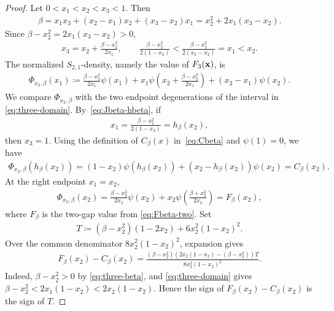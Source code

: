 \documentclass[10pt,a4paper]{article}
\begin{document}
\begin{proof}
Let $0<x_1<x_2<x_3<1$.  Then
\begin{align}\label{eq:three-beta}
  \beta=x_1x_3+(x_2-x_1)x_2+(x_3-x_2)x_1=x_2^2+2x_1(x_3-x_2).
\end{align}
Since $\beta-x_2^2=2x_1(x_3-x_2)>0$,
\begin{align}\label{eq:three-domain}
  x_3=x_2+\frac{\beta-x_2^2}{2x_1},
  \qquad
  \frac{\beta-x_2^2}{2(1-x_2)}<\frac{\beta-x_2^2}{2(x_3-x_2)}=x_1<x_2.
\end{align}
The normalized $S_{2,1}$-density, namely the value of $F_3(\bf x)$, is
\begin{align}\label{eq:Phi-three}
  \Phi_{x_2,\beta}(x_1)\coloneqq\frac{\beta-x_2^2}{2x_1}\psi(x_1)
  +x_1\psi\left(x_2+\frac{\beta-x_2^2}{2x_1}\right)
  +(x_2-x_1)\psi(x_2).
\end{align}
We compare $\Phi_{x_2,\beta}$ with the two endpoint degenerations of the interval in \eqref{eq:three-domain}.  By~\eqref{eq:Jbeta-hbeta}, if
\begin{align*}
  x_1=\frac{\beta-x_2^2}{2(1-x_2)}=h_\beta(x_2),
\end{align*}
then $x_3=1$. Using the definition of $C_\beta(x)$ in~\eqref{eq:Cbeta} and $\psi(1)=0$, we have
\begin{align*}
  \Phi_{x_2,\beta}(h_\beta(x_2))=(1-x_2)\psi(h_\beta(x_2))+(x_2-h_\beta(x_2))\psi(x_2)=C_\beta(x_2).
\end{align*}
At the right endpoint $x_1=x_2$,
\begin{align*}
  \Phi_{x_2,\beta}(x_2)=\frac{\beta-x_2^2}{2x_2}\psi(x_2)+x_2\psi\left(\frac{\beta+x_2^2}{2x_2}\right)=F_\beta(x_2),
\end{align*}
where $F_\beta$ is the two-gap value from \eqref{eq:Fbeta-two}.
Set
\begin{align*}
  T\coloneqq(\beta-x_2^2)(1-2x_2)+6x_2^2(1-x_2)^2.
\end{align*}
Over the common denominator $8x_2^2(1-x_2)^2$, expansion gives
\begin{align}\label{eq:three-endpoint-diff}
  F_\beta(x_2)-C_\beta(x_2)=\frac{(\beta-x_2^2)(2x_2(1-x_2)-(\beta-x_2^2))T}{8x_2^2(1-x_2)^2}.
\end{align}
Indeed, $\beta-x_2^2>0$ by \eqref{eq:three-beta}, and \eqref{eq:three-domain} gives
$
  \beta-x_2^2<2x_1(1-x_2)<2x_2(1-x_2).
$
Hence the sign of $F_\beta(x_2)-C_\beta(x_2)$ is the sign of $T$.


\end{proof}
\end{document}
